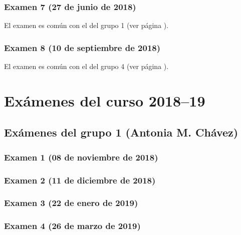 \documentclass[a4paper,12pt,twoside]{book}
\begin{document}
\subsection{Examen 7 (27 de junio de 2018)}
El examen es común con el del grupo 1 (ver página \pageref{examen_17_18_4_7}).
\subsection{Examen 8 (10 de septiembre de 2018)}
El examen es común con el del grupo 4 (ver página \pageref{examen_17_18_4_8}).

\chapter{Exámenes del curso 2018--19}

\section{Exámenes del grupo 1 (Antonia M. Chávez)}
\subsection{Examen 1 (08 de noviembre de 2018)}
\subsection{Examen 2 (11 de diciembre de 2018)}
\subsection{Examen 3 (22 de enero de 2019)}
 \label{examen_18_19_1_3}
\subsection{Examen 4 (26 de marzo de 2019)}
\end{document}
